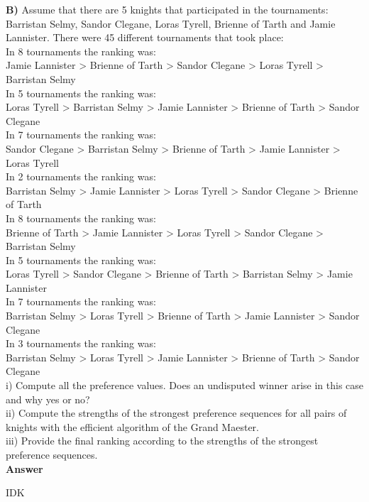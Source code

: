 \documentclass{article}
\begin{document}
\vspace{0.1in}

\noindent \textbf{B)} Assume that there are 5 knights that
participated in the tournaments: Barristan Selmy, Sandor Clegane,
Loras Tyrell, Brienne of Tarth and Jamie Lannister. There were 45
different tournaments that took place:\\

\noindent In 8 tournaments the ranking was:\\ Jamie Lannister > Brienne of Tarth
> Sandor Clegane > Loras Tyrell > Barristan Selmy\\

\noindent In 5 tournaments the ranking was:\\ Loras Tyrell > Barristan Selmy >
Jamie Lannister > Brienne of Tarth > Sandor Clegane\\

\noindent In 7 tournaments the ranking was:\\ Sandor Clegane > Barristan Selmy >
Brienne of Tarth > Jamie Lannister > Loras Tyrell\\

\noindent In 2 tournaments the ranking was:\\ Barristan Selmy > Jamie Lannister >
Loras Tyrell > Sandor Clegane > Brienne of Tarth\\

\noindent In 8 tournaments the ranking was:\\ Brienne of Tarth > Jamie Lannister >
Loras Tyrell > Sandor Clegane > Barristan Selmy\\

\noindent In 5 tournaments the ranking was:\\ Loras Tyrell > Sandor Clegane >
Brienne of Tarth > Barristan Selmy > Jamie Lannister\\

\noindent In 7 tournaments the ranking was:\\ Barristan Selmy > Loras Tyrell >
Brienne of Tarth > Jamie Lannister > Sandor Clegane\\

\noindent In 3 tournaments the ranking was:\\ Barristan Selmy > Loras Tyrell >
Jamie Lannister > Brienne of Tarth > Sandor Clegane\\

\noindent i) Compute all the preference values. Does an undisputed winner
arise in this case and why yes or no?\\

\noindent ii) Compute the strengths of the strongest preference
sequences for all pairs of knights with the efficient algorithm of the
Grand Maester.\\

\noindent iii) Provide the final ranking according to the strengths of
the strongest preference sequences.\\

\textbf{ Answer }
\vspace{0.1in}
\begin{adjustwidth}{1.8em}{0pt}
IDK
\end{adjustwidth}
\end{document}
